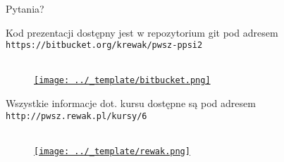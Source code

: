 \appendix

\begin{frame}[standout]
	Pytania?
\end{frame}

\begin{frame}{}

	Kod prezentacji dostępny jest w repozytorium git pod adresem \texttt{https://bitbucket.org/krewak/pwsz-ppsi2} \\ \ \\

	\begin{figure}
		\centering
		\href{https://bitbucket.org/krewak/pwsz-ppsi}{
			\texttt{[image: ../\_template/bitbucket.png]}
		}
	\end{figure}
	
	Wszystkie informacje dot. kursu dostępne są pod adresem \texttt{http://pwsz.rewak.pl/kursy/6} \\ \ \\

	\begin{figure}
		\centering
		\href{http://pwsz.rewak.pl/kursy/3}{
			\texttt{[image: ../\_template/rewak.png]}
		}
	\end{figure}

\end{frame}


